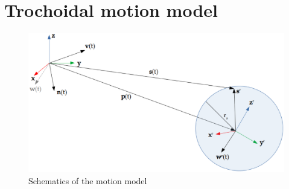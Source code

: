 \section{Trochoidal motion model}

\begin{figure}
  \centering
  \includegraphics[width=\linewidth]{img/schematics}
  \caption{Schematics of the motion model}
  \label{fig:schematics}
\end{figure}

